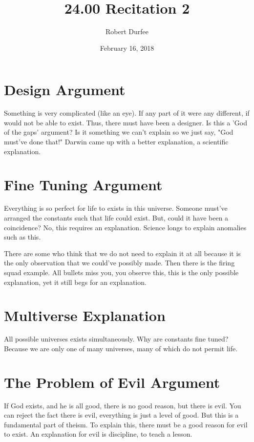\documentclass{article}
\title{ 24.00 Recitation 2 }
\author{ Robert Durfee }
\date{ February 16, 2018 }
\begin{document}
\maketitle

\section{ Design Argument }

Something is very complicated (like an eye). If any part of it were any
different, if would not be able to exist. Thus, there must have been a designer.
Is this a 'God of the gaps' argument? Is it something we can't explain so we
just say, "God must've done that!" Darwin came up with a better explanation, a
scientific explanation.

\section{Fine Tuning Argument}

Everything is so perfect for life to exists in this universe. Someone must've
arranged the constants such that life could exist. But, could it have been a
coincidence? No, this requires an explanation. Science longs to explain
anomalies such as this.

There are some who think that we do not need to explain it at all because it is
the only observation that we could've possibly made. Then there is the firing
squad example. All bullets miss you, you observe this, this is the only possible
explanation, yet it still begs for an explanation.

\section{Multiverse Explanation}

All possible universes exists simultaneously. Why are constants fine tuned?
Because we are only one of many universes, many of which do not permit life.

\section{The Problem of Evil Argument}

If God exists, and he is all good, there is no good reason, but there is evil.
You can reject the fact there is evil, everything is just a level of good. But
this is a fundamental part of theism. To explain this, there must be a good
reason for evil to exist. An explanation for evil is discipline, to teach a
lesson.
\end{document}
